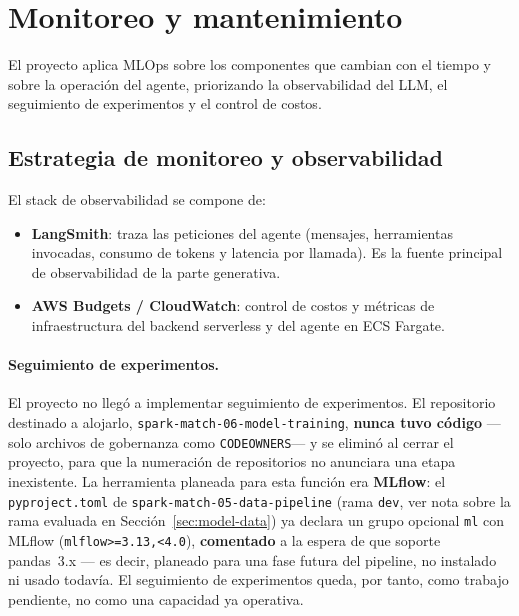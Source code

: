 \section{Monitoreo y mantenimiento}
\label{sec:monitoring}

El proyecto aplica MLOps sobre los componentes que cambian con el tiempo y sobre
la operaci\'on del agente, priorizando la observabilidad del LLM, el seguimiento
de experimentos y el control de costos.

\subsection{Estrategia de monitoreo y observabilidad}

El stack de observabilidad se compone de:

\begin{itemize}[noitemsep]
  \item \textbf{LangSmith}: traza las peticiones del agente (mensajes,
        herramientas invocadas, consumo de tokens y latencia por llamada). Es la
        fuente principal de observabilidad de la parte generativa.
  \item \textbf{AWS Budgets / CloudWatch}: control de costos y m\'etricas de
        infraestructura del backend serverless y del agente en ECS Fargate.
\end{itemize}

\paragraph{Seguimiento de experimentos.} El proyecto no lleg\'o a implementar
seguimiento de experimentos. El repositorio destinado a alojarlo,
\texttt{spark-match-06-model-training}, \textbf{nunca tuvo c\'odigo} ---solo
archivos de gobernanza como \texttt{CODEOWNERS}--- y se elimin\'o al cerrar el
proyecto, para que la numeraci\'on de repositorios no anunciara una etapa
inexistente. La herramienta planeada para esta funci\'on era \textbf{MLflow}:
el \texttt{pyproject.toml} de
\texttt{spark-match-05-data-pipeline} (rama \texttt{dev}, ver nota sobre la
rama evaluada en Secci\'on~\ref{sec:model-data}) ya declara un grupo opcional
\texttt{ml} con MLflow (\texttt{mlflow>=3.13,<4.0}), \textbf{comentado} a la
espera de que soporte pandas~3.x --- es decir, planeado para una fase futura
del pipeline, no instalado ni usado todav\'ia. El seguimiento de experimentos
queda, por tanto, como trabajo pendiente, no como una capacidad ya operativa.

